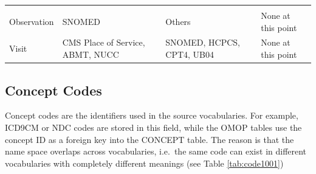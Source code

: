 \documentclass[11pt]{book}
\theoremstyle{definition}
\theoremstyle{definition}
\theoremstyle{definition}
\theoremstyle{remark}
\begin{document}
\begin{longtable}[]{@{}llll@{}}
\begin{minipage}[t]{0.18\columnwidth}
\end{minipage}\tabularnewline
\begin{minipage}[t]{0.12\columnwidth}\raggedright\strut
Observation\strut
\end{minipage} & \begin{minipage}[t]{0.21\columnwidth}\raggedright\strut
SNOMED\strut
\end{minipage} & \begin{minipage}[t]{0.21\columnwidth}\raggedright\strut
Others\strut
\end{minipage} & \begin{minipage}[t]{0.18\columnwidth}\raggedright\strut
None at this point\strut
\end{minipage}\tabularnewline
\begin{minipage}[t]{0.12\columnwidth}\raggedright\strut
Visit\strut
\end{minipage} & \begin{minipage}[t]{0.21\columnwidth}\raggedright\strut
CMS Place of Service, ABMT, NUCC\strut
\end{minipage} & \begin{minipage}[t]{0.21\columnwidth}\raggedright\strut
SNOMED, HCPCS, CPT4, UB04\strut
\end{minipage} & \begin{minipage}[t]{0.18\columnwidth}\raggedright\strut
None at this point\strut
\end{minipage}\tabularnewline
\bottomrule
\end{longtable}

\subsection{Concept Codes}\label{concept-codes}

Concept codes are the identifiers used in the source vocabularies. For
example, ICD9CM or NDC codes are stored in this field, while the OMOP
tables use the concept ID as a foreign key into the CONCEPT table. The
reason is that the name space overlaps across vocabularies, i.e.~the
same code can exist in different vocabularies with completely different
meanings (see Table \ref{tab:code1001}) 
\end{document}
